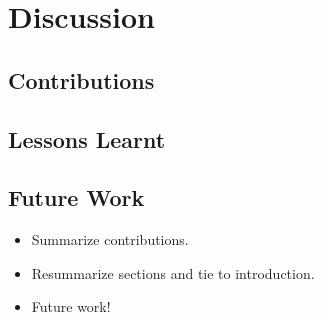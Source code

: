 \section{Discussion}
\subsection{Contributions}

\subsection{Lessons Learnt}

\subsection{Future Work}


\begin{itemize}
    \item Summarize contributions. 
    \item Resummarize sections and tie to introduction. 
    \item Future work! 
\end{itemize}